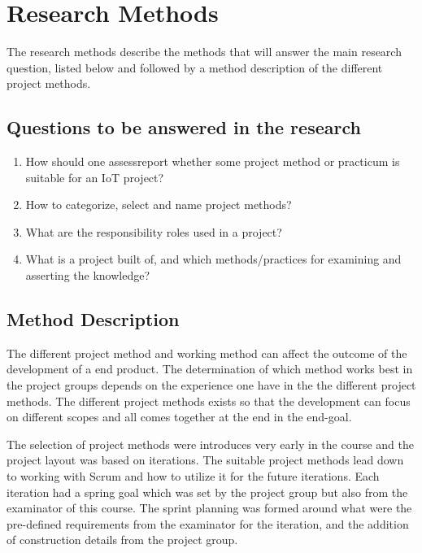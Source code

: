 \section{Research Methods}


The research methods describe the methods that will answer the main research question, listed below and followed by a method description of the different project methods.


\subsection{Questions to be answered in the research}

\begin{enumerate}
    \item{How should one assess\/report whether some project method or practicum is suitable for an IoT project?}
    \item{How to categorize, select and name project methods?}
    \item{What are the responsibility roles used in a project?}
    \item{What is a project built of, and which methods/practices for examining and asserting the knowledge?}
\end{enumerate}

\subsection{Method Description}

The different project method and working method can affect the outcome of the development of a end product.
The determination of which method works best in the project groups depends on the experience one have in the the different project methods. 
The different project methods exists so that the development can focus on different scopes and all comes together at the end in the end-goal.

The selection of project methods were introduces very early in the course and the project layout was based on iterations.
The suitable project methods lead down to working with Scrum\cite{atlassianScrum} and how to utilize it for the future iterations. 
Each iteration had a spring goal which was set by the project group but also from the examinator of this course. 
The sprint planning was formed around what were the pre-defined requirements from the examinator for the iteration, and the addition of construction details from the project group.

